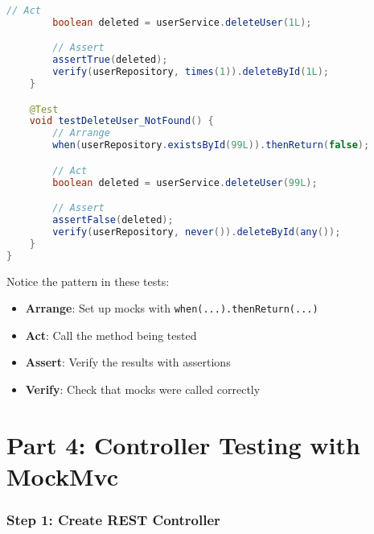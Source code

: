 \documentclass[12pt,a4paper]{article}
\begin{document}
\begin{lstlisting}[language=java, caption=UserServiceTest.java - Unit Tests with Mockito]
        // Act
        boolean deleted = userService.deleteUser(1L);

        // Assert
        assertTrue(deleted);
        verify(userRepository, times(1)).deleteById(1L);
    }

    @Test
    void testDeleteUser_NotFound() {
        // Arrange
        when(userRepository.existsById(99L)).thenReturn(false);

        // Act
        boolean deleted = userService.deleteUser(99L);

        // Assert
        assertFalse(deleted);
        verify(userRepository, never()).deleteById(any());
    }
}
\end{lstlisting}

\begin{importantbox}
Notice the pattern in these tests:
\begin{itemize}
    \item \textbf{Arrange}: Set up mocks with \texttt{when(...).thenReturn(...)}
    \item \textbf{Act}: Call the method being tested
    \item \textbf{Assert}: Verify the results with assertions
    \item \textbf{Verify}: Check that mocks were called correctly
\end{itemize}
\end{importantbox}

\newpage

\part{Part 4: Controller Testing with MockMvc}

\section{Step 1: Create REST Controller}
\end{document}
